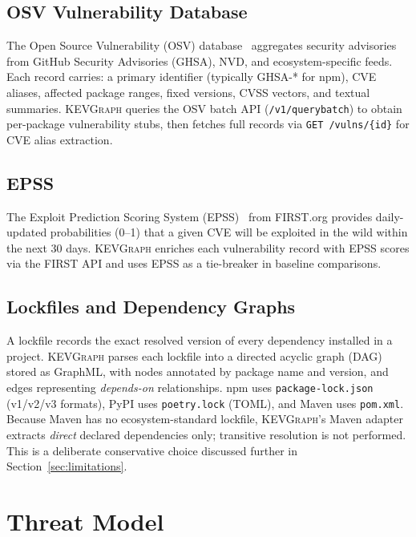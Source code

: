 \documentclass[conference]{IEEEtran}
\newcommand{\kevgraph}{\textsc{KEVGraph}\xspace}
\begin{document}
\subsection{OSV Vulnerability Database}

The Open Source Vulnerability (OSV) database~\cite{osv} aggregates
security advisories from GitHub Security Advisories (GHSA), NVD, and
ecosystem-specific feeds.  Each record carries: a primary identifier
(typically GHSA-* for npm), CVE aliases, affected package ranges,
fixed versions, CVSS vectors, and textual summaries.  \kevgraph queries
the OSV batch API (\texttt{/v1/querybatch}) to obtain per-package
vulnerability stubs, then fetches full records via
\texttt{GET /vulns/\{id\}} for CVE alias extraction.

\subsection{EPSS}

The Exploit Prediction Scoring System (EPSS)~\cite{epss} from
FIRST.org provides daily-updated probabilities (0--1) that a given
CVE will be exploited in the wild within the next 30 days.  \kevgraph
enriches each vulnerability record with EPSS scores via the
FIRST API and uses EPSS as a tie-breaker in baseline comparisons.

\subsection{Lockfiles and Dependency Graphs}

A lockfile records the exact resolved version of every dependency
installed in a project.  \kevgraph parses each lockfile into a directed
acyclic graph (DAG) stored as GraphML, with nodes annotated by package
name and version, and edges representing \emph{depends-on} relationships.
npm uses \texttt{package-lock.json} (v1/v2/v3 formats), PyPI uses
\texttt{poetry.lock} (TOML), and Maven uses \texttt{pom.xml}.  Because
Maven has no ecosystem-standard lockfile, \kevgraph's Maven adapter
extracts \emph{direct} declared dependencies only; transitive resolution
is not performed.  This is a deliberate conservative choice discussed
further in Section~\ref{sec:limitations}.

\section{Threat Model}
\label{sec:threat}
\end{document}
